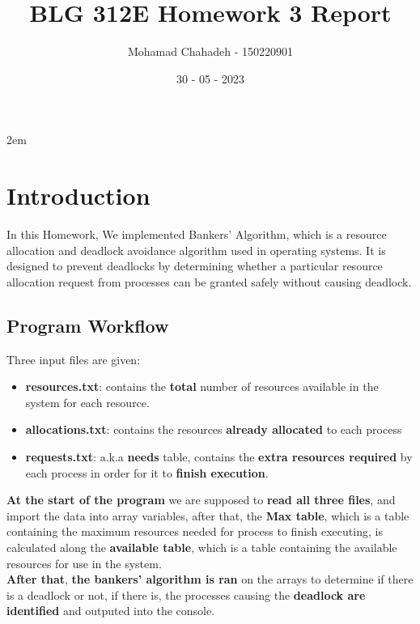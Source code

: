 \documentclass[pdftex,12pt,a4paper]{article}
\title{BLG 312E Homework 3 Report}
\author{Mohamad Chahadeh - 150220901}
\date{30 - 05 - 2023}
\begin{document}
{\def\null\vskip 2em{}\maketitle}

\section{Introduction}
In this Homework, We implemented Bankers' Algorithm, which is a resource allocation and deadlock avoidance algorithm used in operating systems. It is designed to prevent deadlocks by determining whether a particular resource allocation request from processes can be granted safely without causing deadlock.
\subsection{Program Workflow}
\noindent Three input files are given:
\begin{itemize}
    \item \textbf{resources.txt}: contains the \textbf{total} number of resources available in the system for each resource.
    \item \textbf{allocations.txt}: contains the resources \textbf{already allocated} to each process
    \item \textbf{requests.txt}: a.k.a \textbf{needs} table, contains the \textbf{extra resources required} by each process in order for it to \textbf{finish execution}.
\end{itemize}
\textbf{At the start of the program} we are supposed to \textbf{read all three files}, and import the data into array variables, after that, the \textbf{Max table}, which is a table containing the maximum resources needed for process to finish executing, is calculated along the \textbf{available table}, which is a table containing the available resources for use in the system. \\ 
\textbf{After that}, \textbf{the bankers' algorithm is ran} on the arrays to determine if there is a deadlock or not, if there is, the processes causing the \textbf{deadlock are identified} and outputed into the console.
\end{document}
